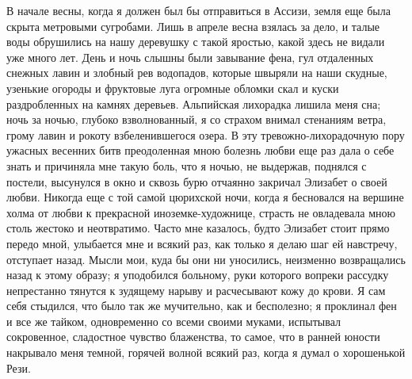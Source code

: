 В начале весны, когда я должен  был бы отправиться в Ассизи, земля еще
была скрыта метровыми сугробами. Лишь  в апреле весна взялась за дело,
и талые воды обрушились на нашу деревушку с такой яростью, какой здесь
не видали уже  много лет. День и ночь слышны  были завывание фена, гул
отдаленных снежных лавин  и злобный рев водопадов,  которые швыряли на
наши скудные, узенькие огороды и  фруктовые луга огромные обломки скал
и куски раздробленных на  камнях деревьев. Альпийская лихорадка лишила
меня сна;  ночь за ночью,  глубоко взволнованный, я со  страхом внимал
стенаниям ветра,  грому лавин  и рокоту  взбеленившегося озера.  В эту
тревожно-лихорадочную  пору ужасных  весенних  битв преодоленная  мною
болезнь любви  еще раз дала о  себе знать и причиняла  мне такую боль,
что  я ночью,  не выдержав,  поднялся с  постели, высунулся  в окно  и
сквозь бурю  отчаянно закричал Элизабет  о своей любви. Никогда  еще с
той самой цюрихской ночи, когда я бесновался на вершине холма от любви
к  прекрасной иноземке-художнице,  страсть  не  овладевала мною  столь
жестоко и неотвратимо. Часто мне  казалось, будто Элизабет стоит прямо
передо мной,  улыбается мне и  всякий раз, как  только я делаю  шаг ей
навстречу,  отступает назад.  Мысли  мои, куда  бы  они ни  уносились,
неизменно возвращались  назад к  этому образу; я  уподобился больному,
руки которого вопреки рассудку непрестанно тянутся к зудящему нарыву и
расчесывают  кожу до  крови.  Я сам  себя стыдился,  что  было так  же
мучительно,  как  и бесполезно;  я  проклинал  фен  и все  же  тайком,
одновременно со всеми своими муками, испытывал сокровенное, сладостное
чувство  блаженства, то  самое,  что в  ранней  юности накрывало  меня
темной, горячей волной всякий раз, когда я думал о хорошенькой Рези.

